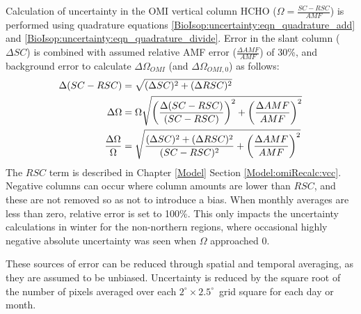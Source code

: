 \documentclass[acp, manuscript]{copernicus}
\newcommand{\Oomi}{\Omega_{OMI}} %
\newcommand{\lowhr}{$2^{\circ} \times 2.5^{\circ}$}
\begin{document}
\begin{description}
        Calculation of uncertainty in the OMI vertical column HCHO ($\Omega  = \frac{SC - RSC}{AMF}$) is performed using quadrature equations \ref{BioIsop:uncertainty:eqn_quadrature_add} and \ref{BioIsop:uncertainty:eqn_quadrature_divide}.
        Error in the slant column ($\Delta SC$) is combined with assumed relative AMF error ($\frac{\Delta AMF}{AMF}$) of 30\%, and background error to calculate $\Delta \Oomi$ (and $\Delta \Omega_{OMI,0}$) as follows:
        \begin{align}
        \Delta (SC-RSC) & = \sqrt{(\Delta SC)^2 + (\Delta RSC)^2} \notag \\
        \Delta \Omega   & = \Omega \sqrt{ \left( \frac{\Delta (SC-RSC)}{(SC-RSC)} \right)^2 + \left( \frac{\Delta AMF}{AMF} \right)^2 } \notag \\
        \frac{\Delta \Omega}{\Omega} & = \sqrt{ \frac{ (\Delta SC)^2 + (\Delta RSC)^2}{(SC-RSC)^2} + \left( \frac{\Delta AMF}{AMF} \right)^2 } \label{BioIsop:uncertainty:satellite:eqn_VCC_uncertainty} 
        \end{align}
        The $RSC$ term is described in Chapter \ref{Model} Section \ref{Model:omiRecalc:vcc}.
        Negative columns can occur where column amounts are lower than $RSC$, and these are not removed so as not to introduce a bias.
        When monthly averages are less than zero, relative error is set to 100\%.
        This only impacts the uncertainty calculations in winter for the non-northern regions, where occasional highly negative absolute uncertainty was seen when $\Omega$ approached 0.
        
        
        
        
    \end{description}
    These sources of error can be reduced through spatial and temporal averaging, as they are assumed to be unbiased.
    Uncertainty is reduced by the square root of the number of pixels averaged over each \lowhr ~grid square for each day or month.
\end{document}
